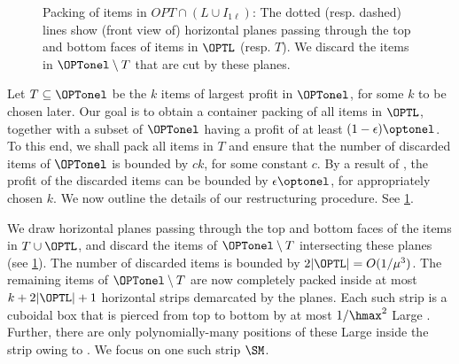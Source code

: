 \begin{figure}
    \centering
    
    \caption{Packing of items in $OPT \cap (L\cup I_{1\ell})$: The dotted (resp. dashed) lines show (front view of) horizontal planes passing through the top and bottom faces of items in $\OPTL$ (resp.  $T$). We discard the items in $\OPTonel \setminus T$ that are cut by these planes.}
    \label{fig:Planes cutting}
\end{figure}

Let $T\subseteq \OPTonel$ be the $k$ items of largest profit in $\OPTonel$, for some $k$ to be chosen later. Our goal is to obtain a container packing of all items in $\OPTL$, together with a subset of $\OPTonel$ having a profit of at least $(1-\epsilon)\optonel$. To this end, we shall pack all items in $T$ and ensure that the number of discarded items of $\OPTonel$ is bounded by $ck$, for some constant $c$. By a result of \cite{jansen1999improved}, the profit of the discarded items can be bounded by $\epsilon \optonel$, for appropriately chosen $k$. We now outline the details of our restructuring procedure. See \cref{fig:Planes cutting}.

We draw horizontal planes passing through the top and bottom faces of the items in $T\cup \OPTL$, and discard the items of $\OPTonel \setminus T$  intersecting these planes (see \cref{fig:Planes cutting}). The number of discarded items is bounded by $2|\OPTL|=O(1/\mu^3)$. The remaining items of $\OPTonel\setminus T$ are now completely packed inside at most $k+2|\OPTL|+1$ horizontal strips demarcated by the planes. Each such strip is a cuboidal box that is pierced from top to bottom by at most $1/\hmax^2$ Large . Further, there are only polynomially-many positions of these Large  inside the strip owing to . We focus on one such strip $\SM$.

